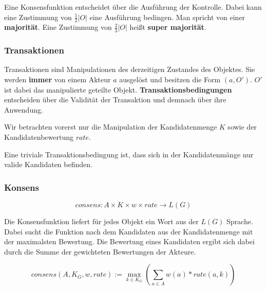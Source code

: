 \documentclass[]{article}
\begin{document}
Eine Konsensfunktion entscheidet über die Ausführung der Kontrolle. Dabei kann eine Zustimmung von $\frac{1}{2}|O|$ eine Ausführung bedingen. Man spricht von einer \textbf{majorität}. Eine Zustimmung von $\frac{2}{3}|O|$ heißt \textbf{super majorität}.





% 



\subsubsection*{Transaktionen}

Transaktionen sind Manipulationen des derzeitigen Zustandes des Objektes. Sie werden \textbf{immer} von einem Akteur $a$ ausgelöst und besitzen die Form $(a, O')$. $O'$ ist dabei das manipulierte geteilte Objekt. \textbf{Transaktionsbedingungen} entscheiden über die Validität der Transaktion und demnach über ihre Anwendung.

Wir betrachten vorerst nur die Manipulation der Kandidatenmenge $K$ sowie der Kandidatenbewertung $rate$. 

Eine triviale Transaktionsbedingung ist, dass sich in der Kandidatenmänge nur valide Kandidaten befinden.


\subsubsection*{Konsens}

  \[consens: A\times K\times w \times rate \rightarrow L(G)\] 


Die Konsensfunktion liefert für jedes Objekt ein Wort aus der $L(G)$ Sprache.
Dabei sucht die Funktion nach dem Kandidaten aus der Kandidatenmenge mit der maximalsten Bewertung. Die Bewertung eines Kandidaten ergibt sich dabei durch die Summe der gewichteten Bewertungen der Akteure.

\[ consens (A,K_G,w,rate) := \max_{k\in K_G} ( \sum_{a\in A} w(a) * rate(a,k) ) \] 
\end{document}
